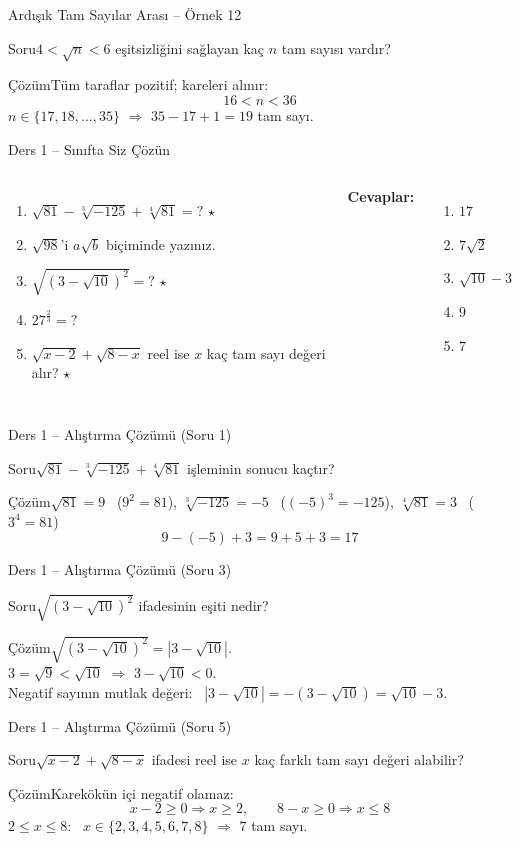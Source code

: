 \documentclass[aspectratio=169,11pt]{beamer}
\newcommand{\soru}[3]{%
\begin{frame}{#1}
  \begin{block}{Soru}\large #2\end{block}
  \pause
  \begin{exampleblock}{Çözüm}\large #3\end{exampleblock}
\end{frame}}
\begin{document}
\soru{Ardışık Tam Sayılar Arası -- Örnek 12}
{\(4<\sqrt{n}<6\) eşitsizliğini sağlayan kaç \(n\) tam sayısı vardır?}
{Tüm taraflar pozitif; kareleri alınır:
\[16<n<36\]
\(n\in\{17,18,\dots,35\}\) \(\Rightarrow\) \(35-17+1=19\) tam sayı.}

\begin{frame}{Ders 1 -- Sınıfta Siz Çözün}
\begin{columns}[t]
\begin{enumerate}
\item \(\sqrt{81}-\sqrt[3]{-125}+\sqrt[4]{81}=?\) \(\star\)
\item \(\sqrt{98}\)'i \(a\sqrt{b}\) biçiminde yazınız.
\item \(\sqrt{(3-\sqrt{10})^2}=?\) \(\star\)
\item \(27^{\frac23}=?\)
\item \(\sqrt{x-2}+\sqrt{8-x}\) reel ise \(x\) kaç tam sayı değeri alır? \(\star\)
\end{enumerate}
\pause
\textbf{Cevaplar:}
\begin{enumerate}
\item \(17\)
\item \(7\sqrt2\)
\item \(\sqrt{10}-3\)
\item \(9\)
\item \(7\)
\end{enumerate}
\end{columns}
\vspace{4pt}{\footnotesize \(\star\) işaretli soruların adım adım çözümü sonraki slaytlardadır.}
\end{frame}

\soru{Ders 1 -- Alıştırma Çözümü (Soru 1)}
{\(\sqrt{81}-\sqrt[3]{-125}+\sqrt[4]{81}\) işleminin sonucu kaçtır?}
{\(\sqrt{81}=9\) \ (\(9^2=81\)), \quad \(\sqrt[3]{-125}=-5\) \ (\((-5)^3=-125\)), \quad \(\sqrt[4]{81}=3\) \ (\(3^4=81\))
\[9-(-5)+3=9+5+3=17\]}

\soru{Ders 1 -- Alıştırma Çözümü (Soru 3)}
{\(\sqrt{(3-\sqrt{10})^2}\) ifadesinin eşiti nedir?}
{\(\sqrt{(3-\sqrt{10})^2}=|3-\sqrt{10}|\).\\[3pt]
\(3=\sqrt9<\sqrt{10}\) \(\Rightarrow\) \(3-\sqrt{10}<0\).\\[3pt]
Negatif sayının mutlak değeri: \ \(|3-\sqrt{10}|=-(3-\sqrt{10})=\sqrt{10}-3\).}

\soru{Ders 1 -- Alıştırma Çözümü (Soru 5)}
{\(\sqrt{x-2}+\sqrt{8-x}\) ifadesi reel ise \(x\) kaç farklı tam sayı değeri alabilir?}
{Karekökün içi negatif olamaz:
\[x-2\ge 0\Rightarrow x\ge 2,\qquad 8-x\ge 0\Rightarrow x\le 8\]
\(2\le x\le 8\): \ \(x\in\{2,3,4,5,6,7,8\}\) \(\Rightarrow\) \(7\) tam sayı.}
\end{document}
